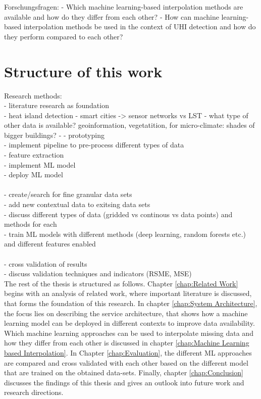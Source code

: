 Forschungsfragen:
- Which machine learning-based interpolation methods are available and how do they differ from each other?
- How can machine learning-based interpolation methods be used in the context of UHI detection and how do they perform compared to each other?

\section{Structure of this work}

Research methods:\\
- literature research as foundation\\
    - heat island detection
        - smart cities -> sensor networks vs LST
        - what type of other data is available? geoinformation, vegetatition, for micro-climate: shades of bigger buildings?
    - 
- prototyping\\
    - implement pipeline to pre-process different types of data\\
    - feature extraction\\
    - implement ML model\\
    - deploy ML model\\
\\
- create/search for fine granular data sets\\
    - add new contextual data to exitsing data sets\\
    - discuss different types of data (gridded vs continous vs data points) and methods for each
\\
- train ML models with different methods (deep learning, random forests etc.) and different features enabled\\
\\
- cross validation of results\\
    - discuss validation techniques and indicators (RSME, MSE)\\


The rest of the thesis is structured as follows. Chapter \ref{chap:Related Work} begins with an analysis of related work, where important literature is discussed, that forms the foundation of this research. In chapter \ref{chap:System Architecture}, the focus lies on describing the service architecture, that shows how a machine learning model can be deployed in different contexts to improve data availability. Which machine learning approaches can be used to interpolate missing data and how they differ from each other is discussed in chapter \ref{chap:Machine Learning based Interpolation}. In Chapter \ref{chap:Evaluation}, the different ML approaches are compared and cross validated with each other based on the different model that are trained on the obtained data-sets. Finally, chapter \ref{chap:Conclusion} discusses the findings of this thesis and gives an outlook into future work and research directions.
